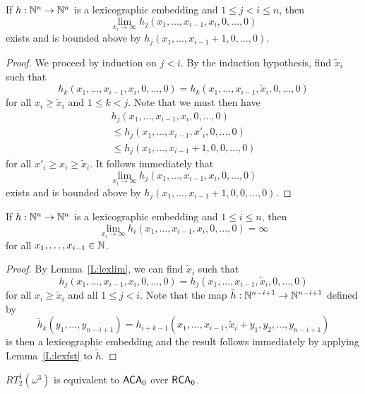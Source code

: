 \begin{lem}\label{L:lexlim}
If $h:\mathbb{N}^n\to\mathbb{N}^n$ is a lexicographic embedding and
$1 \leq j < i \leq n$, then
$$\lim_{x_i\to\infty} h_j(x_1,\dots,x_{i-1},x_i,0,\dots,0)$$
exists and is bounded above by $h_j(x_1,\dots,x_{i-1}+1,0,\dots,0)$.
\end{lem}

\begin{proof}
We proceed by induction on $j < i$.
By the induction hypothesis, find $\tilde{x}_i$ such that
$$h_k(x_1,\dots,x_{i-1},x_i,0,\dots,0) = h_k(x_1,\dots,x_{i-1},\tilde{x}_i,0,\dots,0)$$
for all $x_i \geq \tilde{x}_i$ and $1 \leq k < j$.
Note that we must then have
\begin{multline*}
  h_j(x_1,\dots,x_{i-1},x_i,0,\dots,0) \\
  \leq h_j(x_1,\dots,x_{i-1},x'_i,0,\dots,0) \\
  \leq h_j(x_1,\dots,x_{i-1}+1,0,0,\dots,0)
\end{multline*}
for all $x'_i \geq x_i \geq \tilde{x}_i$.
It follows immediately that
$$\lim_{x_i\to\infty} h_j(x_1,\dots,x_{i-1},x_i,0,\dots,0)$$
exists and is bounded above by $h_j(x_1,\dots,x_{i-1}+1,0,0,\dots,0)$.
\end{proof}

\begin{lem}\label{L:lexinf}
If $h:\mathbb{N}^n\to\mathbb{N}^n$ is a lexicographic embedding and
$1 \leq i \leq n$, then
$$\lim_{x_i\to\infty} h_i(x_1,\dots,x_{i-1},x_i,0,\dots,0) = \infty$$
for all $x_1,\dots,x_{i-1} \in \mathbb{N}$.
\end{lem}

\begin{proof}
By Lemma~\ref{L:lexlim}, we can find $\tilde{x}_i$ such that
$$h_j(x_1,\dots,x_{i-1},x_i,0,\dots,0) = h_j(x_1,\dots,x_{i-1},\tilde{x}_i,0,\dots,0)$$
for all $x_i \geq \tilde{x}_i$ and all $1 \leq j < i$.
Note that the map $\tilde{h}:\mathbb{N}^{n-i+1}\to\mathbb{N}^{n-i+1}$ defined by
$$\tilde{h}_k(y_1,\dots,y_{n-i+1}) = h_{i+k-1}(x_1,\dots,x_{i-1},\tilde{x}_i+y_1,y_2,\dots,y_{n-i+1})$$
is then a lexicographic embedding and the result follows immediately
by applying Lemma~\ref{L:lexfst} to $\tilde{h}$.
\end{proof}

\begin{thm}
  $RT^1_2(\omega^3)$ is equivalent to $\mathsf{ACA}_0$ over $\mathsf{RCA}_0$.
\end{thm}


